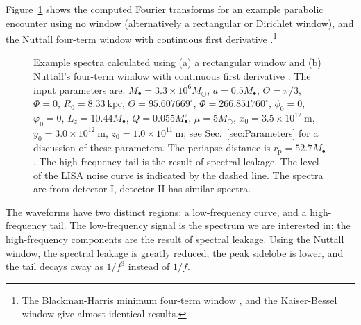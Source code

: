 \documentclass[useAMS,usedcolumn,usegraphicx,usenatbib]{mn2e}
\newcommand{\Figref}[1]{Figure~\ref{fig:#1}}
\newcommand{\secref}[1]{Sec.~\ref{sec:#1}}
\newcommand{\units}[1]{\ensuremath{~\mathrm{#1}}}
\newcommand{\sub}[1]{\ensuremath{_\mathrm{#1}}}
\begin{document}
{\Figref{Windowing} shows the computed Fourier transforms for an example parabolic encounter using no window (alternatively a rectangular or Dirichlet window), and the Nuttall four-term window with continuous first derivative \citep{Nuttall1981}.\footnote{The Blackman-Harris minimum four-term window \citep{Harris1978, Nuttall1981}, and the Kaiser-Bessel window \citep{Harris1978, Kaiser1980} give almost identical results.}
\begin{figure}[htbp]
  \begin{center}
    \caption{Example spectra calculated using (a) a rectangular window and (b) Nuttall's four-term window with continuous first derivative \citep{Nuttall1981}. The input parameters are: $M_\bullet =3.3 \times 10^6 M_\odot$, $a = 0.5 M_\bullet$, $\Theta = \pi/3$, $\Phi = 0$, $R_0 = 8.33\units{kpc}$, $\overline{\Theta} = {95.607669}^{\circ}$, $\overline{\Phi} = {266.851760}^{\circ}$, $\overline{\phi}_0 = 0$, $\varphi_0 = 0$, $L_z = 10.44 M_\bullet$, $Q = 0.055 M_\bullet^2$, $\mu = 5 M_\odot$, $x_0 = 3.5 \times 10^{12}\units{m}$, $y_0 = 3.0 \times 10^{12}\units{m}$, $z_0 = 1.0 \times 10^{11}\units{m}$; see \secref{Parameters} for a discussion of these parameters. The periapse distance is $r\sub{p} = 52.7 M_\bullet$. The high-frequency tail is the result of spectral leakage. The level of the LISA noise curve is indicated by the dashed line. The spectra are from detector I, detector II has similar spectra.}
    \label{fig:Windowing}
  \end{center}
\end{figure}
The waveforms have two distinct regions: a low-frequency curve, and a high-frequency tail. The low-frequency signal is the spectrum we are interested in; the high-frequency components are the result of spectral leakage. Using the Nuttall window, the spectral leakage is greatly reduced; the peak sidelobe is lower, and the tail decays away as $1/{f^3}$ instead of $1/{f}$.

}
\end{document}
